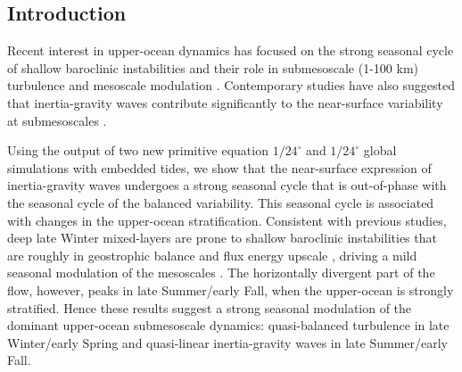 \documentclass[grl]{agutex2015}
\begin{document}
\begin{article}

%
%

\section{Introduction}

Recent interest in upper-ocean dynamics has focused on the strong seasonal
cycle of shallow baroclinic instabilities and their role in submesoscale (1-100 km)
turbulence and mesoscale modulation \citep{sasaki_etal2014,qiu_etal2014,
callies_etal2015, thompson_etal2016,buckingham_etal2016}. Contemporary studies
have also suggested that inertia-gravity waves contribute significantly
to the near-surface variability at submesoscales \citep{richman_etal2012,
buhler_etal2014,rocha_etal2016}.

Using the output of two new primitive equation $1/24^\circ$ and $1/24^\circ$ global
 simulations with embedded tides, we show that the near-surface
expression of inertia-gravity waves undergoes a strong seasonal cycle that is out-of-phase
with the seasonal cycle of the balanced variability. This seasonal cycle is associated
with changes in the upper-ocean
stratification. Consistent with previous studies,
deep late Winter mixed-layers are prone to
shallow baroclinic instabilities that are roughly in geostrophic balance
and flux energy upscale \citep{sasaki_etal2014,callies_etal2016},
driving a mild seasonal modulation of the mesoscales \citep{sasaki_etal2014,qiu_etal2014}.
The horizontally divergent part of the flow, however, peaks in late Summer/early Fall,
when the upper-ocean is strongly stratified. Hence these results suggest a
strong seasonal modulation of the dominant upper-ocean submesoscale dynamics:
quasi-balanced turbulence in late Winter/early Spring and
quasi-linear inertia-gravity waves in late Summer/early Fall.


\end{article}
\end{document}
